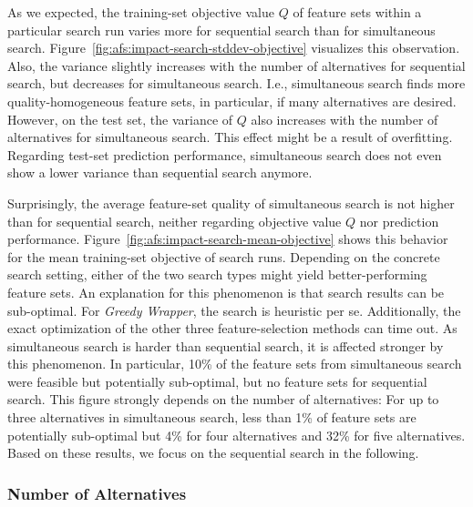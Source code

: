 \documentclass{article}
\theoremstyle{definition}
\begin{document}
As we expected, the training-set objective value $Q$ of feature sets within a particular search run varies more for sequential search than for simultaneous search.
Figure~\ref{fig:afs:impact-search-stddev-objective} visualizes this observation.
Also, the variance slightly increases with the number of alternatives for sequential search, but decreases for simultaneous search.
I.e., simultaneous search finds more quality-homogeneous feature sets, in particular, if many alternatives are desired.
However, on the test set, the variance of $Q$ also increases with the number of alternatives for simultaneous search.
This effect might be a result of overfitting.
Regarding test-set prediction performance, simultaneous search does not even show a lower variance than sequential search anymore.

Surprisingly, the average feature-set quality of simultaneous search is not higher than for sequential search, neither regarding objective value $Q$ nor prediction performance.
Figure~\ref{fig:afs:impact-search-mean-objective} shows this behavior for the mean training-set objective of search runs.
Depending on the concrete search setting, either of the two search types might yield better-performing feature sets.
An explanation for this phenomenon is that search results can be sub-optimal.
For \emph{Greedy Wrapper}, the search is heuristic per se.
Additionally, the exact optimization of the other three feature-selection methods can time out.
As simultaneous search is harder than sequential search, it is affected stronger by this phenomenon.
In particular, 10\% of the feature sets from simultaneous search were feasible but potentially sub-optimal, but no feature sets for sequential search.
This figure strongly depends on the number of alternatives:
For up to three alternatives in simultaneous search, less than 1\% of feature sets are potentially sub-optimal but 4\% for four alternatives and 32\% for five alternatives.
Based on these results, we focus on the sequential search in the following.

\subsubsection{Number of Alternatives}
\label{sec:afs:evaluation:search:num-alternatives}
\end{document}
